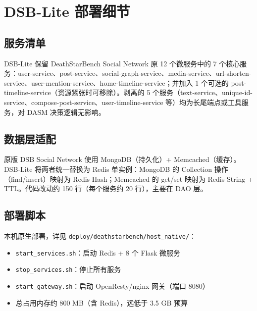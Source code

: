 \appendix
\section{DSB-Lite 部署细节}
\label{app:dsb-deploy}

\subsection{服务清单}
DSB-Lite 保留 DeathStarBench Social Network 原 12 个微服务中的 7 个核心服务：user-service、post-service、social-graph-service、media-service、url-shorten-service、user-mention-service、home-timeline-service；并加入 1 个可选的 post-timeline-service（资源紧张时可移除）。剥离的 5 个服务（text-service、unique-id-service、compose-post-service、user-timeline-service 等）均为长尾端点或工具服务，对 DASM 决策逻辑无影响。

\subsection{数据层适配}
原版 DSB Social Network 使用 MongoDB（持久化）+ Memcached（缓存）。DSB-Lite 将两者统一替换为 Redis 单实例：MongoDB 的 Collection 操作（find/insert）映射为 Redis Hash；Memcached 的 get/set 映射为 Redis String + TTL。代码改动约 150 行（每个服务约 20 行），主要在 DAO 层。

\subsection{部署脚本}
本机原生部署，详见 \texttt{deploy/deathstarbench/host\_native/}：
\begin{itemize}
\item \texttt{start\_services.sh}：启动 Redis + 8 个 Flask 微服务
\item \texttt{stop\_services.sh}：停止所有服务
\item \texttt{start\_gateway.sh}：启动 OpenResty/nginx 网关（端口 8080）
\item 总占用内存约 800 MB（含 Redis），远低于 3.5 GB 预算
\end{itemize}
